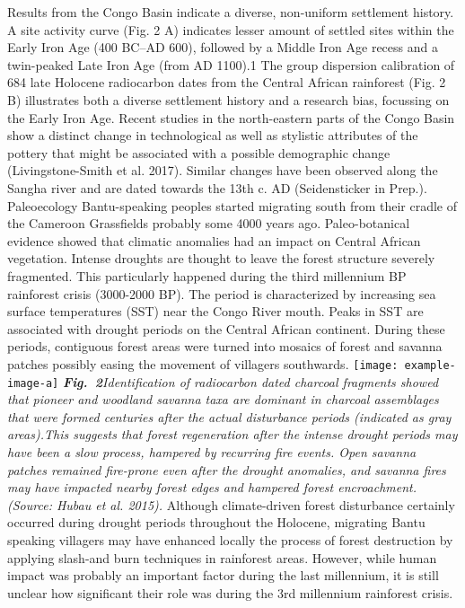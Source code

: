 \documentclass[a0]{sciposter}
\begin{document}
{\begin{minipage}[t][102cm][t]{82cm}
\begin{minipage}[t]{77cm}
\begin{multicols}{3}
\bigbreak
{\fontsize{28}{36} \selectfont Results from the Congo Basin indicate a diverse, non-uniform settlement history. A site activity curve (Fig. 2 A) indicates lesser amount of settled sites within the Early Iron Age (400 BC–AD 600), followed by a Middle Iron Age recess and a twin-peaked Late Iron Age (from AD 1100).1 The group dispersion calibration of 684 late Holocene radiocarbon dates from the Central African rainforest (Fig. 2 B) illustrates both a diverse settlement history and a research bias, focussing on the Early Iron Age.}
\bigbreak
{\fontsize{28}{36} \selectfont Recent studies in the north-eastern parts of the Congo Basin show a distinct change in technological as well as stylistic attributes of the pottery that might be associated with a possible demographic change (Livingstone-Smith et al. 2017). Similar changes have been observed along the Sangha river and are dated towards the 13th c. AD (Seidensticker in Prep.).}
\vfill\null
\columnbreak
{\fontsize{38}{42} \selectfont \textcolor{HeadCol}{Paleoecology}}
\bigbreak
{\fontsize{28}{36} \selectfont Bantu-speaking peoples started migrating south from their cradle of the Cameroon Grassfields probably some 4000 years ago. Paleo-botanical evidence showed that climatic anomalies had an impact on Central African vegetation. Intense droughts are thought to leave the forest structure severely fragmented. This particularly happened during the third millennium BP rainforest crisis (3000-2000 BP). The period is characterized by increasing sea surface temperatures (SST) near the Congo River mouth. Peaks in SST are associated with drought periods on the Central African continent. During these periods, contiguous forest areas were turned into mosaics of forest and savanna patches possibly easing the movement of villagers southwards.}
\bigbreak
\texttt{[image: example-image-a]}
\bigbreak
{\fontsize{28}{36} \selectfont \textit{\textbf{Fig.~2}\hspace{1em}Identification of radiocarbon dated charcoal fragments showed that pioneer and woodland savanna taxa are dominant in charcoal assemblages that were formed centuries after the actual disturbance periods (indicated as gray areas).This suggests that forest regeneration after the intense drought periods may have been a slow process, hampered by recurring fire events. Open savanna patches remained fire-prone even after the drought anomalies, and savanna fires may have impacted nearby forest edges and hampered forest encroachment. (Source: Hubau et al. 2015).}}
\bigbreak
{\fontsize{28}{36} \selectfont Although climate-driven forest disturbance certainly occurred during drought periods throughout the Holocene, migrating Bantu speaking villagers may have enhanced locally the process of forest destruction by applying slash-and burn techniques in rainforest areas. However, while human impact was probably an important factor during the last millennium, it is still unclear how significant their role was during the 3rd millennium rainforest crisis.}


\end{multicols}
\end{minipage}
\end{minipage}}
\end{document}
